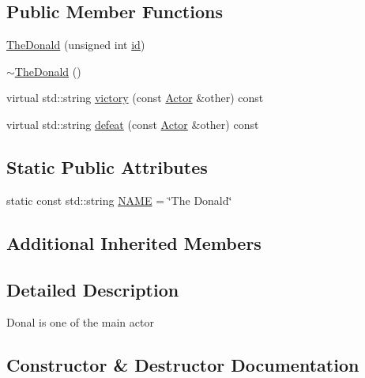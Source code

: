 \subsection*{Public Member Functions}
\begin{DoxyCompactItemize}
\item 
\hyperlink{classTheDonald_a3e3d985e27af763356a7936d8bf190d8}{The\+Donald} (unsigned int \hyperlink{classActor_a084438abd4bcb9d5e17b8ad75b0f5984}{id})
\item 
\hyperlink{classTheDonald_a0c0193bf480aceaaebc3598da56409e8}{$\sim$\+The\+Donald} ()
\item 
virtual std\+::string \hyperlink{classTheDonald_abee1d5bb4910c657ffd41fc745298cdc}{victory} (const \hyperlink{classActor}{Actor} \&other) const 
\item 
virtual std\+::string \hyperlink{classTheDonald_ac6920f6026c3b0d91afbce90f6f07fad}{defeat} (const \hyperlink{classActor}{Actor} \&other) const 
\end{DoxyCompactItemize}
\subsection*{Static Public Attributes}
\begin{DoxyCompactItemize}
\item 
static const std\+::string \hyperlink{classTheDonald_a5524e0abfd4ea1eb4f22f526f4583732}{N\+A\+ME} = \char`\"{}The Donald\char`\"{}
\end{DoxyCompactItemize}
\subsection*{Additional Inherited Members}


\subsection{Detailed Description}
Donal is one of the main actor 

\subsection{Constructor \& Destructor Documentation}
